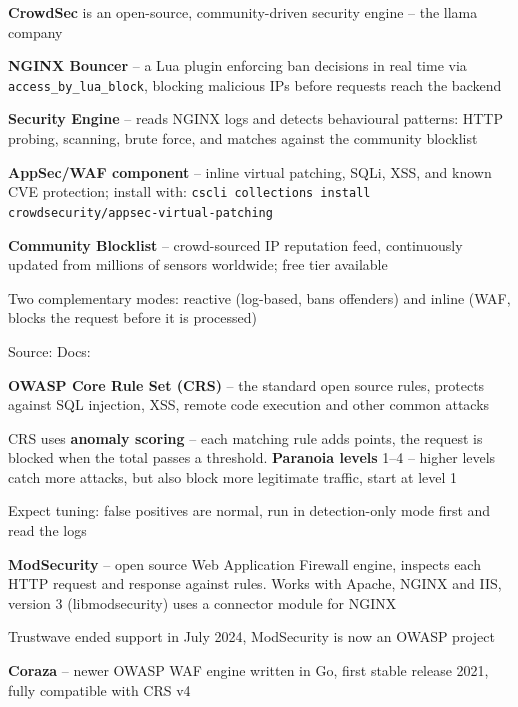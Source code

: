 \documentclass[Screen16to9,17pt]{foils}
\begin{document}


\begin{list2}
\item {\bf CrowdSec} is an open-source, community-driven security engine -- the llama company 
\item {\bf NGINX Bouncer} -- a Lua plugin enforcing ban decisions in real time via \verb+access_by_lua_block+,
blocking malicious IPs before requests reach the backend
\item {\bf Security Engine} -- reads NGINX logs and detects behavioural patterns: HTTP probing,
scanning, brute force, and matches against the community blocklist
\item {\bf AppSec/WAF component} -- inline virtual patching, SQLi, XSS, and known CVE protection;
install with:
\verb+cscli collections install crowdsecurity/appsec-virtual-patching+
\item {\bf Community Blocklist} -- crowd-sourced IP reputation feed, continuously updated from
millions of sensors worldwide; free tier available
\item Two complementary modes: reactive (log-based, bans offenders) and
inline (WAF, blocks the request before it is processed)
\end{list2}
Source: Docs: 



\begin{list2}
\item {\bf OWASP Core Rule Set (CRS)} -- the standard open source rules, protects against SQL injection, XSS, remote code execution and other common attacks 
\item CRS uses {\bf anomaly scoring} -- each matching rule adds points, the request is blocked when the total passes a threshold. {\bf Paranoia levels} 1--4 -- higher levels catch more attacks, but also block more legitimate traffic, start at level 1
\item Expect tuning: false positives are normal, run in detection-only mode first and read the logs
\item {\bf ModSecurity} -- open source Web Application Firewall engine, inspects each HTTP request and response against rules. Works with Apache, NGINX and IIS, version 3 (libmodsecurity) uses a connector module for NGINX
\item Trustwave ended support in July 2024, ModSecurity is now an OWASP project\\
\item {\bf Coraza} -- newer OWASP WAF engine written in Go, first stable release 2021, fully compatible with CRS v4\\

\end{list2}
\end{document}
